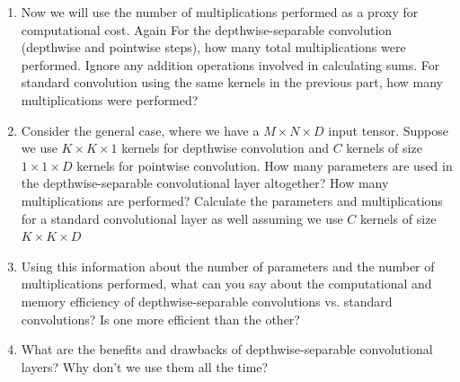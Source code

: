 \documentclass{article}
\begin{document}
\begin{enumerate}[label=(\alph*)]
    \item Now we will use the number of multiplications performed as a proxy for computational cost. Again For the depthwise-separable convolution (depthwise and pointwise steps), how many total multiplications were performed. Ignore any addition operations involved in calculating sums. For standard convolution using the same kernels in the previous part, how many multiplications were performed?

    \item Consider the general case, where we have a $M \times N \times D$ input tensor. Suppose we use $K \times K \times 1$ kernels for depthwise convolution and $C$ kernels of size $1 \times 1\times D$ kernels for pointwise convolution. How many parameters are used in the depthwise-separable convolutional layer altogether? How many multiplications are performed? Calculate the parameters and multiplications for a standard convolutional layer as well assuming we use $C$ kernels of size $K \times K \times D$

    \item Using this information about the number of parameters and the number of multiplications performed, what can you say about the computational and memory efficiency of depthwise-separable convolutions vs. standard convolutions? Is one more efficient than the other?

    \item What are the benefits and drawbacks of depthwise-separable convolutional layers? Why don't we use them all the time?
\end{enumerate}

\newpage
\thispagestyle{plain}
\end{document}
